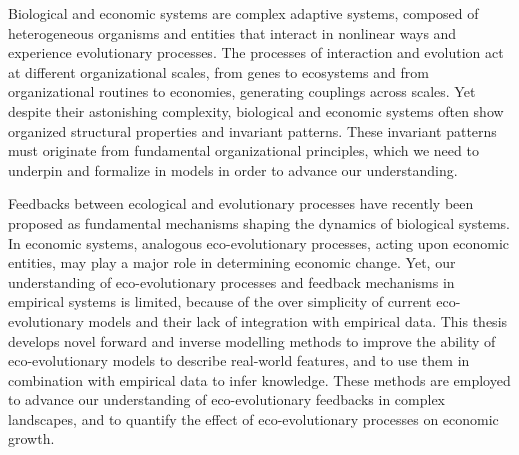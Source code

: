 %
\label{sec:summary}

Biological and economic systems are complex adaptive systems, composed of heterogeneous organisms and entities that interact in nonlinear ways and experience evolutionary processes.
% 
The processes of interaction and evolution act at different organizational scales, from genes to ecosystems and from organizational routines to economies, generating couplings across scales. Yet despite their astonishing complexity, biological and economic systems often show organized structural properties and invariant patterns. 
% 
%
These invariant patterns must originate from fundamental organizational principles, which we need to underpin and formalize in models in order to advance our understanding.

Feedbacks between ecological and evolutionary processes have recently been proposed as fundamental mechanisms shaping the dynamics of biological systems. %
% 
In economic systems, analogous eco-evolutionary processes, acting upon economic entities, may play a major role in determining economic change. 
Yet, our understanding of eco-evolutionary processes and feedback mechanisms in empirical systems is limited, because of the over simplicity of current eco-evolutionary models and their lack of integration with empirical data. %
% 
This thesis develops novel forward and inverse modelling methods to improve the ability of eco-evolutionary models to describe real-world features, and to use them in combination with empirical data to infer knowledge. These methods are employed to advance our understanding of eco-evolutionary feedbacks in complex landscapes, and to quantify the effect of eco-evolutionary processes on economic growth.

